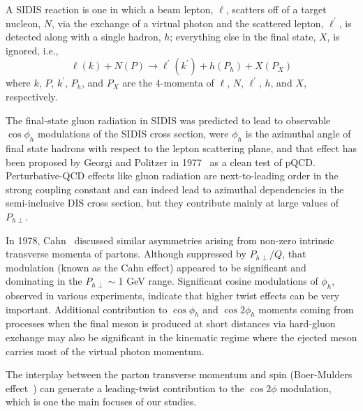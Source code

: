 \documentclass[aps,prl,twocolumn,showpacs,superscriptaddress,groupedaddress]{revtex4}  %
\newcommand{\Phperp}{P_{h\perp}}
\begin{document}
A SIDIS reaction is one in which a beam lepton, $\ell$, scatters off of a target nucleon, $N$, via the exchange of a virtual photon and the scattered lepton, $\ell^{\prime}$, is detected along with a single hadron, $h$; everything else in the final state, $X$, is ignored, i.e.,
\begin{equation}
\label{eq:sidis}
\ell (k) + N(P) \rightarrow \ell^{\prime} (k^{\prime} ) + h(P_{h}) + X(P_{X})
\end{equation}
where $k$, $P$, $k^{\prime}$, $P_{h}$, and $P_{X}$ are the 4-momenta of $\ell$, $N$, $\ell^{\prime}$, $h$, and $X$, respectively.

 The final-state gluon radiation in SIDIS  was predicted to lead to observable $\cos\phi_h$ modulations of the SIDIS cross section,
were $\phi_h$ is the azimuthal angle of final state hadrons with respect to the lepton scattering plane,
and that effect has been  proposed by Georgi and Politzer in  1977~\cite{Georgi:1977tv}  as a clean test of pQCD.
Perturbative-QCD effects like gluon radiation are next-to-leading order in the strong coupling constant and can indeed lead to azimuthal
dependencies in the semi-inclusive DIS cross section, but they contribute mainly at large values of $\Phperp$.

In 1978, Cahn~\cite{Cahn:1978se}   discussed  similar asymmetries arising from non-zero intrinsic transverse momenta of partons.
Although suppressed by $P_{h\perp}/Q$,  that modulation (known as the Cahn effect) appeared to be significant and dominating in the $P_{h\perp} \sim $1 GeV range.
Significant cosine modulations of $\phi_h$, observed in various experiments, indicate that higher twist effects can be very important.
Additional contribution to $\cos \phi_h$ and $\cos 2\phi_h$ moments coming from processes when the final meson
is produced at short distances via hard-gluon exchange \cite{Berger:1979xz} may also be 
significant in the kinematic regime where the ejected meson carries  most of 
the virtual photon momentum.

The interplay between the parton transverse momentum and spin
(Boer-Mulders effect~\cite{Boer:1997nt}) can generate a leading-twist
contribution to the $\cos 2\phi$ modulation, which is one the main focuses of our studies.
\end{document}

